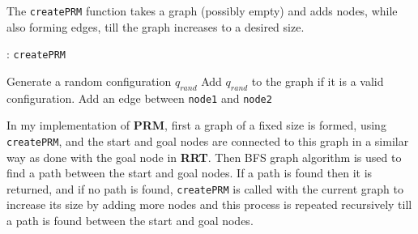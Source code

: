 \documentclass[11pt]{article}
\begin{document}
The \texttt{createPRM} function takes a graph (possibly empty) and adds nodes, while also forming edges, till
the graph increases to a desired size. 
\begin{algorithm}
    \caption{ : \texttt{createPRM}}\label{alg:cap}
    \begin{algorithmic}[1]
        \State  Generate a random configuration $q_{rand}$
        \State Add $q_{rand}$ to the graph if it is a valid configuration.
    \EndWhile
                \State Add an edge between \texttt{node1} and \texttt{node2}
            \EndIf 
        \EndFor
    \EndFor
    \end{algorithmic}
\end{algorithm}

In my implementation of \textbf{PRM}, first a graph of a fixed size is formed, using \texttt{createPRM}, and the start and goal nodes are connected to this
graph in a similar way as done with the goal node in \textbf{RRT}. Then BFS graph algorithm is used
to find a path between the start and goal nodes. If a path is found then it is returned, and if no path is found, \texttt{createPRM} is called with the current graph to 
increase its size by adding more nodes and this process is repeated recursively till a path is found between the start and goal nodes. 
\end{document}
